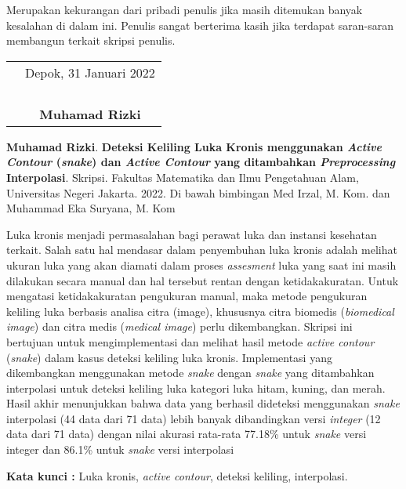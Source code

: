 \documentclass{jtetiskripsi}
\begin{document}
Merupakan kekurangan dari pribadi penulis jika masih ditemukan banyak kesalahan di dalam ini. Penulis sangat berterima kasih jika terdapat saran-saran membangun terkait skripsi penulis.

\vspace{.5cm}

\begin{tabular}{p{7.5cm}c}
	&Depok, 31 Januari 2022\\
	&\\
	&\\
	&\\
	&\\
	&\textbf{Muhamad Rizki}
\end{tabular}
\begin{abstractind}
	\textbf{Muhamad Rizki}. 	\textbf{Deteksi Keliling Luka Kronis menggunakan \emph{Active Contour} (\emph{snake}) dan \emph{Active Contour} yang ditambahkan \emph{Preprocessing} Interpolasi}. Skripsi. Fakultas Matematika dan Ilmu Pengetahuan Alam, Universitas Negeri Jakarta. 2022. Di bawah bimbingan Med Irzal, M. Kom. dan Muhammad Eka Suryana, M. Kom
	\vskip1cm
	
	Luka kronis menjadi permasalahan bagi perawat luka dan instansi kesehatan terkait. Salah satu hal mendasar dalam penyembuhan luka kronis adalah melihat ukuran luka yang akan diamati dalam proses \emph{assesment} luka yang saat ini masih dilakukan secara manual dan hal tersebut rentan dengan ketidakakuratan. Untuk mengatasi ketidakakuratan pengukuran manual, maka metode pengukuran keliling luka berbasis analisa citra (image), khususnya citra biomedis (\emph{biomedical image}) dan citra medis (\emph{medical image}) perlu dikembangkan. Skripsi ini bertujuan untuk mengimplementasi dan melihat hasil metode \emph{active contour} (\emph{snake}) dalam kasus deteksi keliling luka kronis. Implementasi yang dikembangkan menggunakan metode \emph{snake} dengan \emph{snake} yang ditambahkan interpolasi untuk deteksi keliling luka kategori luka hitam, kuning, dan merah. Hasil akhir menunjukkan bahwa data yang berhasil dideteksi menggunakan \emph{snake} interpolasi (44 data dari 71 data) lebih banyak dibandingkan versi \emph{integer} (12 data dari 71 data) dengan nilai akurasi rata-rata 77.18\% untuk \emph{snake} versi integer dan 86.1\% untuk \emph{snake} versi interpolasi
	
	\bigskip
	\noindent
	\textbf{Kata kunci :} Luka kronis, \emph{active contour}, deteksi keliling, interpolasi.
\end{abstractind}
\end{document}
